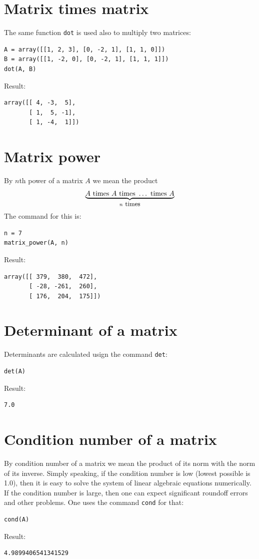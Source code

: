\documentclass{article}
\begin{document}
\section{Matrix times matrix}

The same function {\tt dot} is used also to multiply two matrices:
\begin{verbatim}
A = array([[1, 2, 3], [0, -2, 1], [1, 1, 0]])
B = array([[1, -2, 0], [0, -2, 1], [1, 1, 1]])
dot(A, B)
\end{verbatim}
Result:
\begin{verbatim}
array([[ 4, -3,  5],
       [ 1,  5, -1],
       [ 1, -4,  1]])
\end{verbatim}

\section{Matrix power}

By $n$th power of a matrix $A$ we mean the product
$$
\underbrace{A \ \mbox{times}\ A \ \mbox{times} \ \ldots \ \mbox{times} \ A}_{n \ {\small \mbox{times}}}
$$ 
The command for this is:
\begin{verbatim}
n = 7
matrix_power(A, n)
\end{verbatim}
Result:
\begin{verbatim}
array([[ 379,  380,  472],
       [ -28, -261,  260],
       [ 176,  204,  175]])
\end{verbatim}

\section{Determinant of a matrix}

Determinants are calculated usign the command {\tt det}:
\begin{verbatim}
det(A)
\end{verbatim}
Result:
\begin{verbatim}
7.0
\end{verbatim}

\section{Condition number of a matrix}

By condition number of a matrix we mean the product of its norm with the 
norm of its inverse. Simply speaking, if the condition number is low
(lowest possible is 1.0), then it is easy to solve the system of linear
algebraic equations numerically. If the condition number is large, then
one can expect significant roundoff errors and other problems. One uses
the command {\tt cond} for that:
\begin{verbatim}
cond(A)
\end{verbatim}
Result:
\begin{verbatim}
4.9899406541341529
\end{verbatim}
\end{document}
